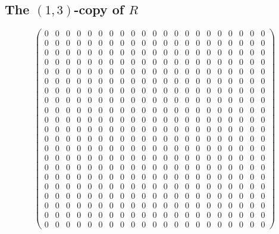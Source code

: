 \documentclass{article}
\begin{document}
\subsection{The $ \left(1, 3\right) $-copy of $R$}
\[ \left(\begin{array}{rrrrrrrrrrrrrrrrrrrrr}
0 & 0 & 0 & 0 & 0 & 0 & 0 & 0 & 0 & 0 & 0 & 0 & 0 & 0 & 0 & 0 & 0 & 0 & 0 & 0 & 0 \\
0 & 0 & 0 & 0 & 0 & 0 & 0 & 0 & 0 & 0 & 0 & 0 & 0 & 0 & 0 & 0 & 0 & 0 & 0 & 0 & 0 \\
0 & 0 & 0 & 0 & 0 & 0 & 0 & 0 & 0 & 0 & 0 & 0 & 0 & 0 & 0 & 0 & 0 & 0 & 0 & 0 & 0 \\
0 & 0 & 0 & 0 & 0 & 0 & 0 & 0 & 0 & 0 & 0 & 0 & 0 & 0 & 0 & 0 & 0 & 0 & 0 & 0 & 0 \\
0 & 0 & 0 & 0 & 0 & 0 & 0 & 0 & 0 & 0 & 0 & 0 & 0 & 0 & 0 & 0 & 0 & 0 & 0 & 0 & 0 \\
0 & 0 & 0 & 0 & 0 & 0 & 0 & 0 & 0 & 0 & 0 & 0 & 0 & 0 & 0 & 0 & 0 & 0 & 0 & 0 & 0 \\
0 & 0 & 0 & 0 & 0 & 0 & 0 & 0 & 0 & 0 & 0 & 0 & 0 & 0 & 0 & 0 & 0 & 0 & 0 & 0 & 0 \\
0 & 0 & 0 & 0 & 0 & 0 & 0 & 0 & 0 & 0 & 0 & 0 & 0 & 0 & 0 & 0 & 0 & 0 & 0 & 0 & 0 \\
0 & 0 & 0 & 0 & 0 & 0 & 0 & 0 & 0 & 0 & 0 & 0 & 0 & 0 & 0 & 0 & 0 & 0 & 0 & 0 & 0 \\
0 & 0 & 0 & 0 & 0 & 0 & 0 & 0 & 0 & 0 & 0 & 0 & 0 & 0 & 0 & 0 & 0 & 0 & 0 & 0 & 0 \\
0 & 0 & 0 & 0 & 0 & 0 & 0 & 0 & 0 & 0 & 0 & 0 & 0 & 0 & 0 & 0 & 0 & 0 & 0 & 0 & 0 \\
0 & 0 & 0 & 0 & 0 & 0 & 0 & 0 & 0 & 0 & 0 & 0 & 0 & 0 & 0 & 0 & 0 & 0 & 0 & 0 & 0 \\
0 & 0 & 0 & 0 & 0 & 0 & 0 & 0 & 0 & 0 & 0 & 0 & 0 & 0 & 0 & 0 & 0 & 0 & 0 & 0 & 0 \\
0 & 0 & 0 & 0 & 0 & 0 & 0 & 0 & 0 & 0 & 0 & 0 & 0 & 0 & 0 & 0 & 0 & 0 & 0 & 0 & 0 \\
0 & 0 & 0 & 0 & 0 & 0 & 0 & 0 & 0 & 0 & 0 & 0 & 0 & 0 & 0 & 0 & 0 & 0 & 0 & 0 & 0 \\
0 & 0 & 0 & 0 & 0 & 0 & 0 & 0 & 0 & 0 & 0 & 0 & 0 & 0 & 0 & 0 & 0 & 0 & 0 & 0 & 0 \\
0 & 0 & 0 & 0 & 0 & 0 & 0 & 0 & 0 & 0 & 0 & 0 & 0 & 0 & 0 & 0 & 0 & 0 & 0 & 0 & 0 \\
0 & 0 & 0 & 0 & 0 & 0 & 0 & 0 & 0 & 0 & 0 & 0 & 0 & 0 & 0 & 0 & 0 & 0 & 0 & 0 & 0 \\
0 & 0 & 0 & 0 & 0 & 0 & 0 & 0 & 0 & 0 & 0 & 0 & 0 & 0 & 0 & 0 & 0 & 0 & 0 & 0 & 0 \\
0 & 0 & 0 & 0 & 0 & 0 & 0 & 0 & 0 & 0 & 0 & 0 & 0 & 0 & 0 & 0 & 0 & 0 & 0 & 0 & 0 \\
0 & 0 & 0 & 0 & 0 & 0 & 0 & 0 & 0 & 0 & 0 & 0 & 0 & 0 & 0 & 0 & 0 & 0 & 0 & 0 & 0
\end{array}\right) \]
\end{document}
